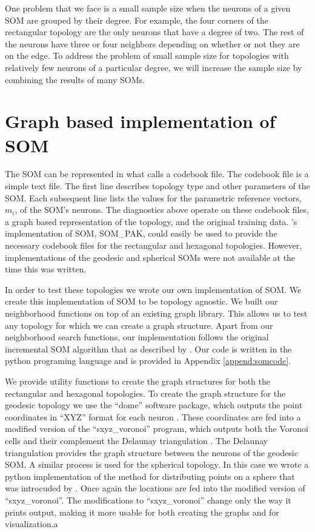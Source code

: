 One problem that we face is a small sample size when the neurons of a given
SOM are grouped by their degree.  For example, the four corners of the
rectangular topology are the only neurons that have a degree of two.  The rest
of the neurons have three or four neighbors depending on whether or not they
are on the edge. To address the problem of small sample size for topologies
with relatively few neurons of a particular degree, we will increase
the sample size by combining the results of many SOMs.

\section{Graph based implementation of SOM}
\label{meth:som}
The SOM can be represented in what \cite{kohonen1996} calls a codebook file.  The
codebook file is a simple text file.  The first line describes topology type and
other parameters of the SOM.  Each subsequent line lists the values for the
parametric reference vectors, $m_i$, of the SOM's neurons.  The diagnostics
above operate on these codebook files, a graph based representation of the
topology, and the original training data.  \citeauthor{kohonen1996}'s
implementation of SOM, SOM\_PAK, could easily be used to provide the necessary
codebook files for the rectangular and hexagonal topologies.  However, 
implementations of the geodesic and spherical SOMs were not available at the
time this was written.

In order to test these topologies we wrote our own implementation of SOM.  We
create this implementation of SOM to be topology agnostic.  We built our
neighborhood functions on top of an existing graph library.  This allows us to
test any topology for which we can create a graph structure.  Apart from our
neighborhood search functions, our implementation follows the original
incremental SOM algorithm that as described by \cite{Kohonen2000}.  Our code
is written in the python programing language and is provided in Appendix
\ref{append:somcode}.

We provide utility functions to create the graph structures for both the
rectangular and hexagonal topologies.  To create the graph structure for the
geodesic topology we use the ``dome'' software package, which outputs the
point coordinates in ``XYZ'' format for each neuron \citep{dome}.  These
coordinates are fed into a modified version of the ``sxyz\_voronoi'' program,
which outputs both the Voronoi cells and their complement the Delaunay
triangulation \citep{Ranka97}.  The Delaunay triangulation provides the graph
structure between the neurons of the geodesic SOM.  A similar process is used
for the spherical topology. In this case we wrote a python implementation of
the method for distributing points on a sphere that was introcuded by
\cite{Rakhmanov94}.  Once again the locations are fed into the modified
version of ``sxyz\_voronoi''.  The modifications to ``sxyz\_voronoi'' change
only the way it prints output, making it more usable for both creating the
graphs and for visualization.a
